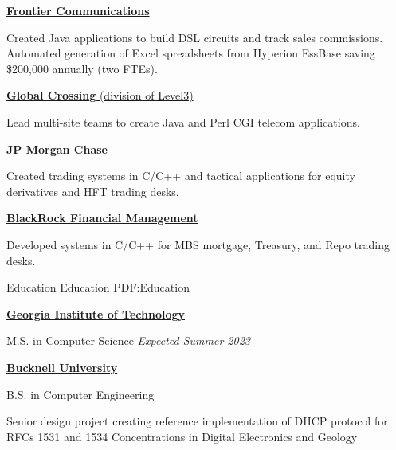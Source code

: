 \documentclass[letterpaper,MMMMyyyy,nonstopmode]{simpleresumecv}
\newcommand{\comment}[1]{\ignorespaces} %
\newif\ifLOCATION
\begin{document}
\begin{Body}
\BigGap
\Entry
\href{http://www.frontier.com/}
{\textbf{Frontier Communications}}

\begin{Detail}
\BulletItem
Created Java applications to build DSL circuits and track sales commissions\comment{; CruiseControl used for Continuous Integration}.  Automated generation of \comment{20} Excel spreadsheets from Hyperion EssBase saving \$200,000 annually (two FTEs).
\end{Detail}

\BigGap
\Entry
\href{http://www.globalcrossing.com/}
{\textbf{Global  Crossing} (division of Level3)}

\begin{Detail}
\BulletItem
Lead multi-site teams to create Java and Perl CGI telecom applications.
\end{Detail}

\BigGap
\Entry
\href{http://www.jpmorganchase.com/}
{\textbf{JP Morgan Chase}}
\begin{Detail}
\BulletItem
Created trading systems in C/C++ and tactical applications for equity derivatives and HFT trading desks.
\end{Detail}

\BigGap
\Entry
\href{http://www.blackrock.com/}
{\textbf{BlackRock Financial Management}}
\begin{Detail}
\BulletItem
Developed systems in C/C++ for MBS mortgage, Treasury, and Repo trading desks.
\end{Detail}
\fi %
%

\Section
{Education}
{Education}
{PDF:Education}

\Entry
\href{https://gatech.edu}
{\textbf{Georgia Institute of Technology}}

M.S. in Computer Science
\hfill 
\textit{Expected Summer 2023}


\Gap

\Entry
\href{http://www.bucknell.edu/}
{\textbf{Bucknell University}}
\ifLOCATION
\hfill Lewisburg, Pennsylvania
\fi

B.S. in Computer Engineering
\iffalse
\hfill
\DatestampYM{1988}{09} --
\DatestampYM{1992}{06}
\fi
\begin{Detail}
\BulletItem
Senior design project creating reference implementation of DHCP protocol for RFCs 1531 and 1534
\BulletItem
Concentrations in Digital Electronics and Geology


\end{Detail}
\end{Body}
\end{document}
